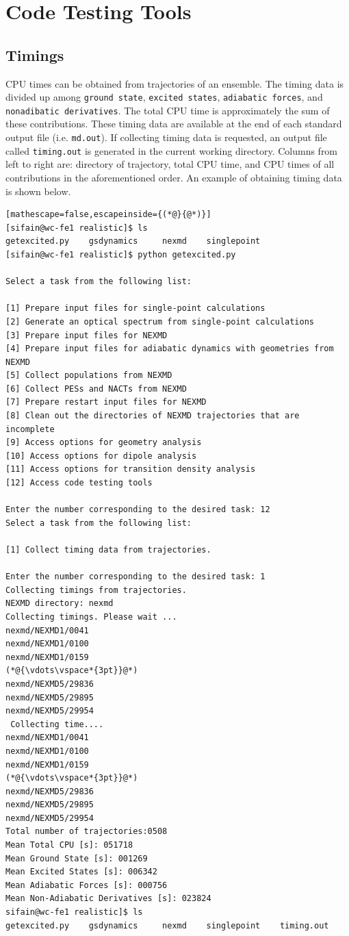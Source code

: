 \documentclass[letterpaper,12pt,titlepage]{article}
\begin{document}
\section{Code Testing Tools}

\subsection{Timings}
CPU times can be obtained from trajectories of an ensemble.  The timing data is divided up among \verb+ground state+, \verb+excited states+, \verb+adiabatic forces+, and \verb+nonadibatic derivatives+.  The total CPU time is approximately the sum of these contributions.  These timing data are available at the end of each standard output file (i.e. \verb+md.out+).  If collecting timing data is requested, an output file called \verb+timing.out+ is generated in the current working directory.  Columns from left to right are: directory of trajectory, total CPU time, and CPU times of all contributions in the aforementioned order.  An example of obtaining timing data is shown below.

\begin{lstlisting}[mathescape=false,escapeinside={(*@}{@*)}]
[sifain@wc-fe1 realistic]$ ls
getexcited.py    gsdynamics     nexmd    singlepoint
[sifain@wc-fe1 realistic]$ python getexcited.py 

Select a task from the following list:

[1] Prepare input files for single-point calculations
[2] Generate an optical spectrum from single-point calculations
[3] Prepare input files for NEXMD
[4] Prepare input files for adiabatic dynamics with geometries from NEXMD
[5] Collect populations from NEXMD
[6] Collect PESs and NACTs from NEXMD
[7] Prepare restart input files for NEXMD
[8] Clean out the directories of NEXMD trajectories that are incomplete
[9] Access options for geometry analysis
[10] Access options for dipole analysis
[11] Access options for transition density analysis
[12] Access code testing tools

Enter the number corresponding to the desired task: 12
Select a task from the following list:

[1] Collect timing data from trajectories.

Enter the number corresponding to the desired task: 1
Collecting timings from trajectories.
NEXMD directory: nexmd
Collecting timings. Please wait ...
nexmd/NEXMD1/0041
nexmd/NEXMD1/0100
nexmd/NEXMD1/0159
(*@{\vdots\vspace*{3pt}}@*)
nexmd/NEXMD5/29836
nexmd/NEXMD5/29895
nexmd/NEXMD5/29954
 Collecting time....
nexmd/NEXMD1/0041
nexmd/NEXMD1/0100
nexmd/NEXMD1/0159
(*@{\vdots\vspace*{3pt}}@*)
nexmd/NEXMD5/29836
nexmd/NEXMD5/29895
nexmd/NEXMD5/29954
Total number of trajectories:0508
Mean Total CPU [s]: 051718
Mean Ground State [s]: 001269
Mean Excited States [s]: 006342
Mean Adiabatic Forces [s]: 000756
Mean Non-Adiabatic Derivatives [s]: 023824
sifain@wc-fe1 realistic]$ ls
getexcited.py    gsdynamics     nexmd    singlepoint    timing.out
\end{lstlisting}
\end{document}
